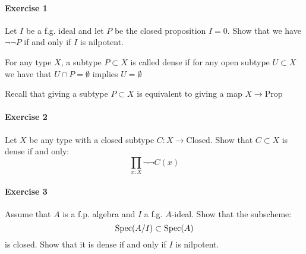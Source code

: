 \paragraph{Exercise 1}{
Let $I$ be a f.g. ideal and let $P$ be the closed proposition $I=0$. Show that we have $\neg\neg P$ if and only if $I$ is nilpotent.}

\begin{definition}
For any type $X$, a subtype $P\subset X$ is called dense if for any open subtype $U\subset X$ we have that $U\cap P = \emptyset$ implies $U=\emptyset$
\end{definition}


Recall that giving a subtype $P\subset X$ is equivalent to giving a map $X\to \mathrm{Prop}$

\paragraph{Exercise 2}{
Let $X$ be any type with a closed subtype $C:X\to \mathrm{Closed}$. Show that $C\subset X$ is dense if and only:
\[\prod_{x:X}\neg\neg C(x)\]
}

\paragraph{Exercise 3}{
Assume that $A$ is a f.p. algebra and $I$ a f.g. $A$-ideal. Show that the subscheme:
\[\operatorname{Spec}(A/I)\subset \operatorname{Spec}(A)\]
is closed. Show that it is dense if and only if $I$ is nilpotent.
}